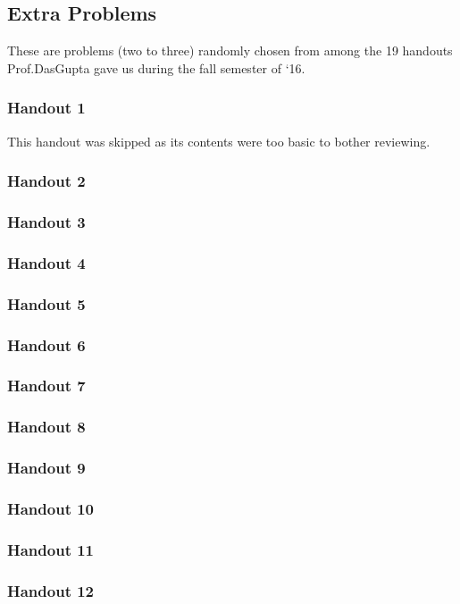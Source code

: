 \subsection{Extra Problems}
These are problems (two to three) randomly chosen from among the 19
handouts Prof.\@ DasGupta gave us during the fall semester of `16.
\subsubsection{Handout 1}
This handout was skipped as its contents were too basic to bother
reviewing.
\subsubsection{Handout 2}

\subsubsection{Handout 3}
\subsubsection{Handout 4}
\subsubsection{Handout 5}
\subsubsection{Handout 6}
\subsubsection{Handout 7}
\subsubsection{Handout 8}
\subsubsection{Handout 9}
\subsubsection{Handout 10}
\subsubsection{Handout 11}
\subsubsection{Handout 12}
